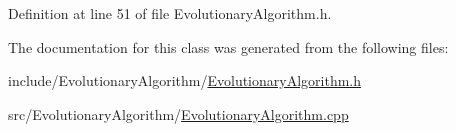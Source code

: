 Definition at line 51 of file Evolutionary\+Algorithm.\+h.



The documentation for this class was generated from the following files\+:\begin{DoxyCompactItemize}
\item 
include/\+Evolutionary\+Algorithm/\hyperlink{EvolutionaryAlgorithm_8h}{Evolutionary\+Algorithm.\+h}\item 
src/\+Evolutionary\+Algorithm/\hyperlink{EvolutionaryAlgorithm_8cpp}{Evolutionary\+Algorithm.\+cpp}\end{DoxyCompactItemize}
